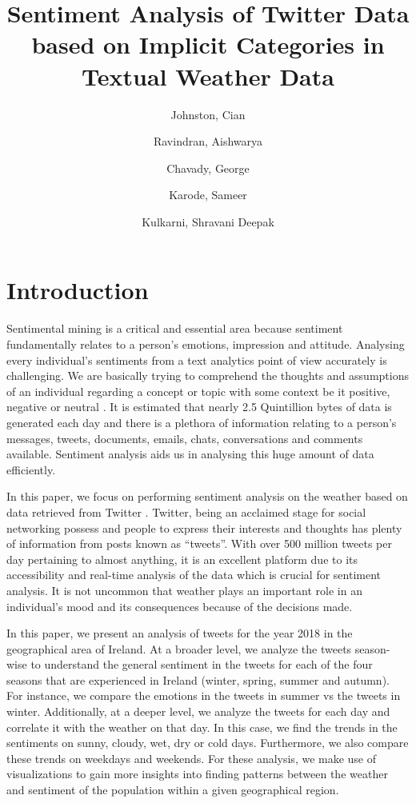 \documentclass[a4paper,10pt]{article}
\begin{document}
    \title{Sentiment Analysis of Twitter Data based on Implicit Categories in Textual Weather Data}
    \author{
        Johnston, Cian
        \and
        Ravindran, Aishwarya
        \and
        Chavady, George
        \and
        Karode, Sameer
        \and
        Kulkarni, Shravani Deepak
    }

    \maketitle
    \section{Introduction}

    Sentimental mining is a critical and essential area because sentiment fundamentally relates to a person’s emotions, impression and attitude. Analysing every individual’s sentiments from a text analytics point of view accurately is challenging. We are basically trying to comprehend the thoughts and assumptions of an individual regarding a concept or topic with some context be it positive, negative or neutral . It is estimated that nearly 2.5 Quintillion bytes of data is generated each day  and there is a plethora of information relating to a person’s messages, tweets, documents, emails, chats, conversations and comments available. Sentiment analysis aids us in analysing this huge amount of data efficiently.

    In this paper, we focus on performing sentiment analysis on the weather based on data retrieved from Twitter . Twitter, being an acclaimed stage for social networking possess and people to express their interests and thoughts has plenty of information from posts known as “tweets”. With over 500 million tweets per day pertaining to almost anything, it is an excellent platform due to its accessibility and real-time analysis of the data which is crucial for sentiment analysis. It is not uncommon that weather plays an important role in an individual’s mood and its consequences because of the decisions made. 
    
    In this paper, we present an analysis of tweets for the year 2018 in the geographical area of Ireland. At a broader level, we analyze the tweets season-wise to understand the general sentiment in the tweets for each of the four seasons that are experienced in Ireland (winter, spring, summer and autumn). For instance, we compare the emotions in the tweets in summer vs the tweets in winter. Additionally, at a deeper level, we analyze the tweets for each day and correlate it with the weather on that day. In this case, we find the trends in the sentiments on sunny, cloudy, wet, dry or cold days. Furthermore, we also compare these trends on weekdays and weekends. For these analysis, we make use of visualizations to gain more insights into finding patterns between the weather and sentiment of the population within a given geographical region.
\end{document}
